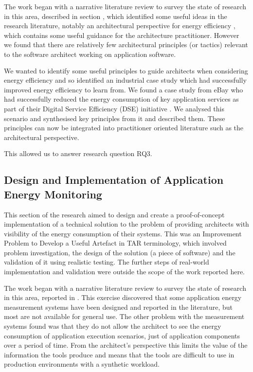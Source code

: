 The work began with a narrative literature review to survey the state of research in this area, described in section , which identified some useful ideas in the research literature, notably an architectural perspective for energy efficiency \cite{jagroep2017-energyperspective}, which contains some useful guidance for the architecture practitioner.  However we found that there are relatively few architectural principles (or tactics) relevant to the software architect working on application software.

We wanted to identify some useful principles to guide architects when considering energy efficiency and so identified an industrial case study which had successfully improved energy efficiency to learn from.  We found a case study from eBay who had successfully reduced the energy consumption of key application services as part of their Digital Service Efficiency (DSE) initiative \cite{ebay2013-digitalefficiency}.  We analysed this scenario and synthesised key principles from it and described them.  These principles can now be integrated into practitioner oriented literature such as the architectural perspective. 

This allowed us to answer research question RQ3.

\subsection{Design and Implementation of Application Energy Monitoring}

This section of the research aimed to design and create a proof-of-concept implementation of a technical solution to the problem of providing architects with visibility of the energy consumption of their systems.  This was an Improvement Problem to Develop a Useful Artefact in TAR terminology, which involved problem investigation, the design of the solution (a piece of software) and the validation of it using realistic testing.  The further steps of real-world implementation and validation \cite{wieringa2012-tar} were outside the scope of the work reported here.

The work began with a narrative literature review to survey the state of research in this area, reported in .  This exercise discovered that some application energy measurement systems have been designed and reported in the literature, but most are not available for general use.  The other problem with the measurement systems found was that they do not allow the architect to see the energy consumption of application execution scenarios, just of application components over a period of time.  From the architect's perspective this limits the value of the information the tools produce and means that the tools are difficult to use in production environments with a synthetic workload.

